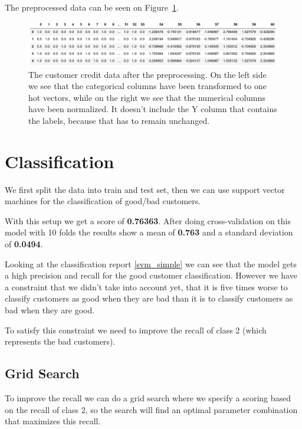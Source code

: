 \documentclass[runningheads]{llncs}
\begin{document}
The preprocessed data can be seen on Figure~\ref{processed_data}.

\begin{figure}
\includegraphics[width=\textwidth]{images/processed_data.png}
\centering
\caption{The customer credit data after the preprocessing. On the left side we see that the categorical columns have been transformed to one hot vectors, while on the right we see that the numerical columns have been normalized. It doesn't include the Y column that contains the labels, because that has to remain unchanged.}
\label{processed_data}
\end{figure}

\section{Classification}

We first split the data into train and test set, then we can use support vector machines \cite{sklearn_svm} for the classification of good/bad customers. 

With this setup we get a score of \textbf{0.76363}. After doing cross-validation on this model with 10 folds the results show a mean of \textbf{0.763} and a standard deviation of \textbf{0.0494}.

Looking at the classification report \ref{svm_simple} we can see that the model gets a high precision and recall for the good customer classification. However we have a constraint that we didn't take into account yet, that it is five times worse to classify customers as good when they are bad than it is to classify customers as bad when they are good. 

To satisfy this constraint we need to improve the recall of class 2 (which represents the bad customers).

\subsection{Grid Search}

To improve the recall we can do a grid search where we specify a scoring based on the recall of class 2, so the search will find an optimal parameter combination that maximizes this recall.
\end{document}
